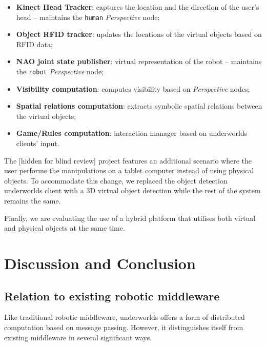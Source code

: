 \documentclass[conference]{IEEEtran}
\newcommand{\uwds}{{\sc underworlds}\xspace}
\begin{document}
\begin{itemize}
    \item \textbf{Kinect Head Tracker}: captures the location and the direction
        of the user's head -- maintains the {\tt human} \emph{Perspective} node;

    \item \textbf{Object RFID tracker}: updates the locations of the virtual
        objects based on RFID data;

    \item \textbf{NAO joint state publisher}: virtual representation of the
        robot -- maintains the {\tt robot} \emph{Perspective} node;

    \item \textbf{Visibility computation}: computes visibility based on
        \emph{Perspective} nodes;

    \item \textbf{Spatial relations computation}: extracts symbolic spatial relations
        between the virtual objects;

    \item \textbf{Game/Rules computation}: interaction manager based on \uwds
        clients' input.

\end{itemize}

The [hidden for blind review] project features an additional scenario where the user performs the
manipulations on a tablet computer instead of using physical objects. To
accommodate this change, we replaced the object detection \uwds client with a 3D
virtual object detection while the rest of the system remains the same.

Finally, we are evaluating the use of a hybrid platform that utilises both virtual and
physical objects at the same time. 


\section{Discussion and Conclusion}

\subsection{Relation to existing robotic middleware}

Like traditional robotic middleware, \uwds offers a form of distributed
computation based on message passing. However, it distinguishes itself from
existing middleware in several significant ways.
\end{document}
